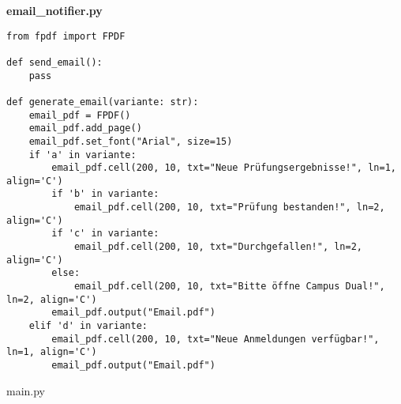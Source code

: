 \textbf{email\_notifier.py}
\begin{code}[H]
    \begin{verbatim}
from fpdf import FPDF

def send_email():
    pass

def generate_email(variante: str):
    email_pdf = FPDF()
    email_pdf.add_page()
    email_pdf.set_font("Arial", size=15)
    if 'a' in variante:
        email_pdf.cell(200, 10, txt="Neue Prüfungsergebnisse!", ln=1, align='C')
        if 'b' in variante:
            email_pdf.cell(200, 10, txt="Prüfung bestanden!", ln=2, align='C')
        if 'c' in variante:
            email_pdf.cell(200, 10, txt="Durchgefallen!", ln=2, align='C')
        else:
            email_pdf.cell(200, 10, txt="Bitte öffne Campus Dual!", ln=2, align='C')
        email_pdf.output("Email.pdf")
    elif 'd' in variante:
        email_pdf.cell(200, 10, txt="Neue Anmeldungen verfügbar!", ln=1, align='C')
        email_pdf.output("Email.pdf")
    \end{verbatim}
    \caption[main.py]{main.py}
    \label{main.py}
\end{code}
